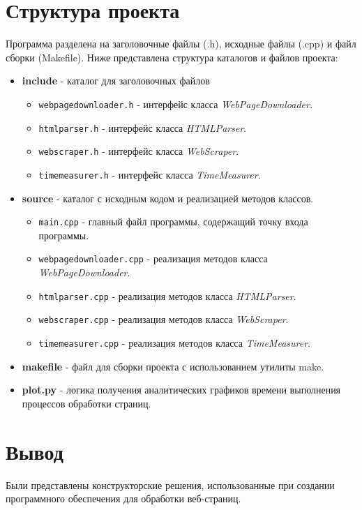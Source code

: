 \section{Структура проекта}

Программа разделена на заголовочные файлы (.h), исходные файлы (.cpp) и файл сборки (Makefile). Ниже представлена структура каталогов и файлов проекта:

\begin{itemize}
	\item \textbf{include} - каталог для заголовочных файлов
	\begin{itemize}
		\item \texttt{webpagedownloader.h} - интерфейс класса \textit{WebPageDownloader}.
		\item \texttt{htmlparser.h} - интерфейс класса \textit{HTMLParser}.
		\item \texttt{webscraper.h} - интерфейс класса \textit{WebScraper}.
		\item \texttt{timemeasurer.h} - интерфейс класса \textit{TimeMeasurer}.
	\end{itemize}
	\item \textbf{source} - каталог с исходным кодом и реализацией методов классов.
	\begin{itemize}
		\item \texttt{main.cpp} - главный файл программы, содержащий точку входа программы.
		\item \texttt{webpagedownloader.cpp} - реализация методов класса \textit{WebPageDownloader}.
		\item \texttt{htmlparser.cpp} - реализация методов класса \textit{HTMLParser}.
		\item \texttt{webscraper.cpp} - реализация методов класса \textit{WebScraper}.
		\item \texttt{timemeasurer.cpp} - реализация методов класса \textit{TimeMeasurer}.
	\end{itemize}
	\item \textbf{makefile} - файл для сборки проекта с использованием утилиты make.
	\item \textbf{plot.py} - логика получения аналитических графиков времени выполнения процессов обработки страниц.
\end{itemize}

\section*{Вывод}
Были представлены конструкторские решения, использованные при создании программного обеспечения для обработки веб-страниц.
